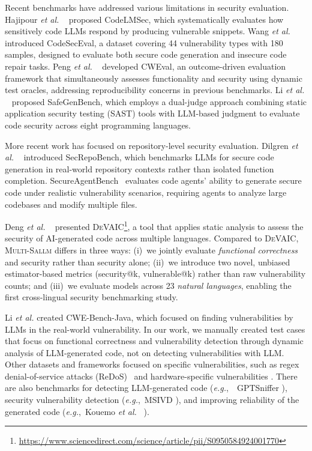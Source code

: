 \documentclass[pdflatex,sn-mathphys-ay]{sn-jnl}
\newcommand{\eg}{\textit{e.g.},\ }
\newcommand{\etal}{\textit{et al.} }
\newcommand{\sandoval}[0]{\textsc{Multi-Sallm}}
\begin{document}
Recent benchmarks have addressed various limitations in security evaluation. Hajipour \etal~\cite{hajipour2024codelmsec} proposed CodeLMSec, which systematically evaluates how sensitively code LLMs respond by producing vulnerable snippets. Wang \etal~\cite{wang2024codeseceval} introduced CodeSecEval, a dataset covering 44 vulnerability types with 180 samples, designed to evaluate both secure code generation and insecure code repair tasks. Peng \etal~\cite{peng2025cweval} developed CWEval, an outcome-driven evaluation framework that simultaneously assesses functionality and security using dynamic test oracles, addressing reproducibility concerns in previous benchmarks. Li \etal~\cite{li2025safegenbench} proposed SafeGenBench, which employs a dual-judge approach combining static application security testing (SAST) tools with LLM-based judgment to evaluate code security across eight programming languages.

More recent work has focused on repository-level security evaluation. Dilgren \etal~\cite{dilgren2025secrepobench} introduced SecRepoBench, which benchmarks LLMs for secure code generation in real-world repository contexts rather than isolated function completion. SecureAgentBench~\cite{yang2025secureagentbench} evaluates code agents' ability to generate secure code under realistic vulnerability scenarios, requiring agents to analyze large codebases and modify multiple files.

Deng \etal~\cite{deng2024devaic} presented \textsc{DeVAIC}\footnote{\url{https://www.sciencedirect.com/science/article/pii/S0950584924001770}}, a tool that applies static analysis to assess the security of AI-generated code across multiple languages. Compared to \textsc{DeVAIC}, \sandoval{} differs in three ways: (i)~we jointly evaluate \textit{functional correctness} and security rather than security alone; (ii)~we introduce two novel, unbiased estimator-based metrics (security@k, vulnerable@k) rather than raw vulnerability counts; and (iii)~we evaluate models across 23 \textit{natural languages}, enabling the first cross-lingual security benchmarking study.

Li \etal \cite{li2025iris} created CWE-Bench-Java, which focused on finding vulnerabilities by LLMs in the real-world vulnerability.
In our work, we manually created test cases that focus on functional correctness and vulnerability detection through dynamic analysis of LLM-generated code, not on detecting vulnerabilities with LLM.
Other datasets and frameworks focused on specific vulnerabilities, such as regex denial-of-service attacks (ReDoS)~\cite{siddiq2024regex} and hardware-specific vulnerabilities \cite{kande2024security}. 
There are also benchmarks for detecting LLM-generated code (\eg~GPTSniffer \cite{nguyen2024gptsniffer}), security vulnerability detection (\eg MSIVD \cite{yang2024securityvulnerabilitydetectionmultitask}), and improving reliability of the generated code (\eg Kouemo \etal~\cite{Ngassom2024}).
\end{document}
